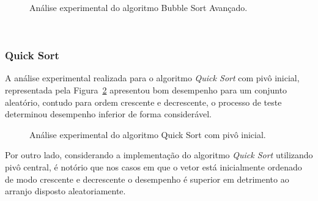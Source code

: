 \documentclass[conference,onecolumn]{IEEEtran}
\begin{document}
\begin{figure}[H]

\centering
{}
\caption{Análise experimental do algoritmo Bubble Sort Avançado.}
\label{image: graph-bubble-adv}
\end{figure}

~\\
\subsubsection{Quick Sort}
A análise experimental realizada para o algoritmo \textit{Quick Sort} com pivô inicial, representada pela Figura~\ref{image: graph-quick-inicial} apresentou bom desempenho para um conjunto aleatório, contudo para ordem crescente e decrescente, o processo de teste determinou desempenho inferior de forma considerável.

\begin{figure}[H]

\centering
{}
\caption{Análise experimental do algoritmo Quick Sort com pivô inicial.}
\label{image: graph-quick-inicial}
\end{figure}


Por outro lado, considerando a implementação do algoritmo \textit{Quick Sort} utilizando pivô central, é notório que nos casos em que o vetor está inicialmente ordenado de modo crescente e decrescente o desempenho é superior em detrimento ao arranjo  disposto aleatoriamente. 
\end{document}
